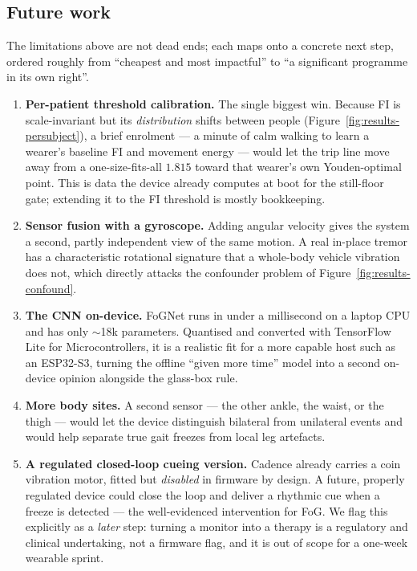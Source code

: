 \subsection{Future work}

The limitations above are not dead ends; each maps onto a concrete next step, ordered
roughly from ``cheapest and most impactful'' to ``a significant programme in its own
right''.

\begin{enumerate}[leftmargin=1.6em]
\item \textbf{Per-patient threshold calibration.} The single biggest win. Because FI is
scale-invariant but its \emph{distribution} shifts between people
(Figure~\ref{fig:results-persubject}), a brief enrolment --- a minute of calm walking to
learn a wearer's baseline FI and movement energy --- would let the trip line move away
from a one-size-fits-all $1.815$ toward that wearer's own Youden-optimal point. This is
data the device already computes at boot for the still-floor gate; extending it to the
FI threshold is mostly bookkeeping.
\item \textbf{Sensor fusion with a gyroscope.} Adding angular velocity gives the system
a second, partly independent view of the same motion. A real in-place tremor has a
characteristic rotational signature that a whole-body vehicle vibration does not, which
directly attacks the confounder problem of Figure~\ref{fig:results-confound}.
\item \textbf{The CNN on-device.} FoGNet runs in under a millisecond on a laptop CPU and
has only $\sim$18k parameters. Quantised and converted with TensorFlow Lite for
Microcontrollers, it is a realistic fit for a more capable host such as an ESP32-S3,
turning the offline ``given more time'' model into a second on-device opinion alongside
the glass-box rule.
\item \textbf{More body sites.} A second sensor --- the other ankle, the waist, or the
thigh --- would let the device distinguish bilateral from unilateral events and would
help separate true gait freezes from local leg artefacts.
\item \textbf{A regulated closed-loop cueing version.} Cadence already carries a coin
vibration motor, fitted but \emph{disabled} in firmware by design. A future, properly
regulated device could close the loop and deliver a rhythmic cue when a freeze is
detected --- the well-evidenced intervention for FoG. We flag this explicitly as a
\emph{later} step: turning a monitor into a therapy is a regulatory and clinical
undertaking, not a firmware flag, and it is out of scope for a one-week wearable sprint.
\end{enumerate}

